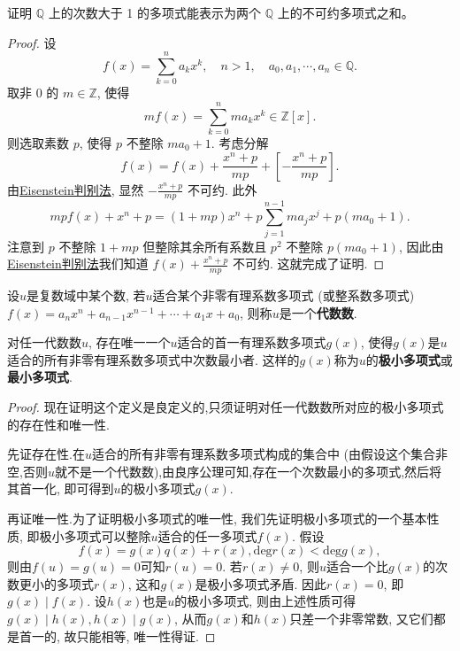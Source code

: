 \documentclass[../../main.tex]{subfiles}%
\begin{document}
\begin{proposition}
证明 \(\mathbb{Q}\) 上的次数大于 1 的多项式能表示为两个 \(\mathbb{Q}\) 上的不可约多项式之和。
\end{proposition}
\begin{proof}
设  
\[
f(x) = \sum_{k=0}^n a_k x^k, \quad n > 1, \quad a_0, a_1, \cdots, a_n \in \mathbb{Q}.
\]
取非 0 的 \(m \in \mathbb{Z}\), 使得  
\[
mf(x) = \sum_{k=0}^n m a_k x^k \in \mathbb{Z}[x].
\]
则选取素数 \(p\), 使得 \(p\) 不整除 \(ma_0 + 1\). 考虑分解  
\[
f(x) = f(x) + \frac{x^n + p}{mp} + \left[ -\frac{x^n + p}{mp} \right].
\]
由\hyperref[theorem:Eisenstein判别法]{Eisenstein判别法}, 显然 \(-\frac{x^n+p}{mp}\) 不可约. 此外  
\[
mpf(x) + x^n + p = (1 + mp)x^n + p\sum_{j=1}^{n-1} ma_j x^j + p(ma_0 + 1).
\]
注意到 \(p\) 不整除 \(1 + mp\) 但整除其余所有系数且 \(p^2\) 不整除 \(p(ma_0 + 1)\), 因此由\hyperref[theorem:Eisenstein判别法]{Eisenstein判别法}我们知道 \(f(x) + \frac{x^n + p}{mp}\) 不可约. 这就完成了证明.
\end{proof}

\begin{definition}[代数数]\label{definition:代数数}
设\(u\)是复数域中某个数, 若\(u\)适合某个非零有理系数多项式 (或整系数多项式)\(f(x)=a_nx^n + a_{n - 1}x^{n - 1}+\cdots+a_1x + a_0\), 则称\(u\)是一个\textbf{代数数}.
\end{definition}

\begin{definition}\label{definition:极小多项式(最小多项式)}
对任一代数数\(u\), 存在唯一一个\(u\)适合的首一有理系数多项式\(g(x)\), 使得\(g(x)\)是\(u\)适合的所有非零有理系数多项式中次数最小者. 这样的\(g(x)\)称为\(u\)的\textbf{极小多项式}或\textbf{最小多项式}.
\end{definition}
\begin{proof}
现在证明这个定义是良定义的,只须证明对任一代数数所对应的极小多项式的存在性和唯一性.

先证存在性.在\(u\)适合的所有非零有理系数多项式构成的集合中 (由假设这个集合非空,否则$u$就不是一个代数数),由良序公理可知,存在一个次数最小的多项式,然后将其首一化, 即可得到\(u\)的极小多项式\(g(x)\). 

再证唯一性.为了证明极小多项式的唯一性, 我们先证明极小多项式的一个基本性质, 即极小多项式可以整除\(u\)适合的任一多项式\(f(x)\). 假设
\[
f(x)=g(x)q(x)+r(x), \mathrm{deg }r(x)<\mathrm{deg }g(x),
\]
则由\(f(u)=g(u)=0\)可知\(r(u)=0\). 若\(r(x)\neq 0\), 则\(u\)适合一个比\(g(x)\)的次数更小的多项式\(r(x)\), 这和\(g(x)\)是极小多项式矛盾. 因此\(r(x)=0\), 即\(g(x)\mid f(x)\). 设\(h(x)\)也是\(u\)的极小多项式, 则由上述性质可得\(g(x)\mid h(x), h(x)\mid g(x)\), 从而\(g(x)\)和\(h(x)\)只差一个非零常数, 又它们都是首一的, 故只能相等, 唯一性得证.
\end{proof}
\end{document}
